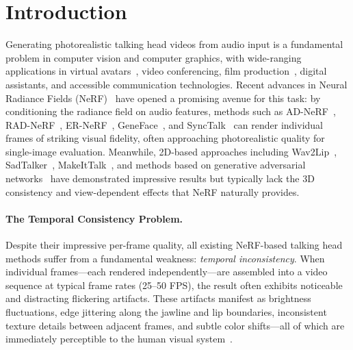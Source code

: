 \documentclass[10pt,twocolumn,letterpaper]{article}
\begin{document}
\section{Introduction}
\label{sec:introduction}

Generating photorealistic talking head videos from audio input is a fundamental problem in computer vision and computer graphics, with wide-ranging applications in virtual avatars~\cite{thies2020nvp}, video conferencing, film production~\cite{kim2019dvp}, digital assistants, and accessible communication technologies.
Recent advances in Neural Radiance Fields (NeRF)~\cite{mildenhall2020nerf} have opened a promising avenue for this task: by conditioning the radiance field on audio features, methods such as AD-NeRF~\cite{guo2021adnerf}, RAD-NeRF~\cite{tang2022radnerf}, ER-NeRF~\cite{li2023ernerf}, GeneFace~\cite{ye2023geneface}, and SyncTalk~\cite{peng2024synctalk} can render individual frames of striking visual fidelity, often approaching photorealistic quality for single-image evaluation.
Meanwhile, 2D-based approaches including Wav2Lip~\cite{prajwal2020wav2lip}, SadTalker~\cite{zhang2023sadtalker}, MakeItTalk~\cite{zhou2020makelttalk}, and methods based on generative adversarial networks~\cite{karras2019stylegan,siarohin2019fomm} have demonstrated impressive results but typically lack the 3D consistency and view-dependent effects that NeRF naturally provides.

\paragraph{The Temporal Consistency Problem.}
Despite their impressive per-frame quality, all existing NeRF-based talking head methods suffer from a fundamental weakness: \emph{temporal inconsistency}.
When individual frames---each rendered independently---are assembled into a video sequence at typical frame rates (25--50 FPS), the result often exhibits noticeable and distracting flickering artifacts.
These artifacts manifest as brightness fluctuations, edge jittering along the jawline and lip boundaries, inconsistent texture details between adjacent frames, and subtle color shifts---all of which are immediately perceptible to the human visual system~\cite{wang2004ssim,zhang2018lpips}.
\end{document}
